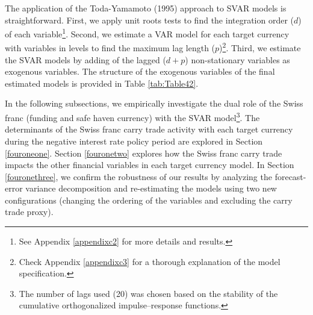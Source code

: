 \documentclass[a4paper, twoside]{templates/ociamthesis}
\begin{document}
The application of the Toda-Yamamoto (1995) approach to SVAR models is straightforward. First, we apply unit roots tests to find the integration order (\(d\)) of each variable\footnote{See Appendix \ref{appendixc2} for more details and results.}. Second, we estimate a VAR model for each target currency with variables in levels to find the maximum lag length (\(p\))\footnote{Check Appendix \ref{appendixc3} for a thorough explanation of the model specification.}. Third, we estimate the SVAR models by adding of the lagged (\(d+p\)) non-stationary variables as exogenous variables. The structure of the exogenous variables of the final estimated models is provided in Table \ref{tab:Table42}.

\begin{table}[!ht]

\caption{\label{tab:Table42}Exogenous variables for each model}
\centering
{}
\end{table}

In the following subsections, we empirically investigate the dual role of the Swiss franc (funding and safe haven currency) with the SVAR model\footnote{The number of lags used (20) was chosen based on the stability of the cumulative orthogonalized impulse--response functions.}. The determinants of the Swiss franc carry trade activity with each target currency during the negative interest rate policy period are explored in Section \ref{fouroneone}. Section \ref{fouronetwo} explores how the Swiss franc carry trade impacts the other financial variables in each target currency model. In Section \ref{fouronethree}, we confirm the robustness of our results by analyzing the forecast-error variance decomposition and re-estimating the models using two new configurations (changing the ordering of the variables and excluding the carry trade proxy).
\end{document}
